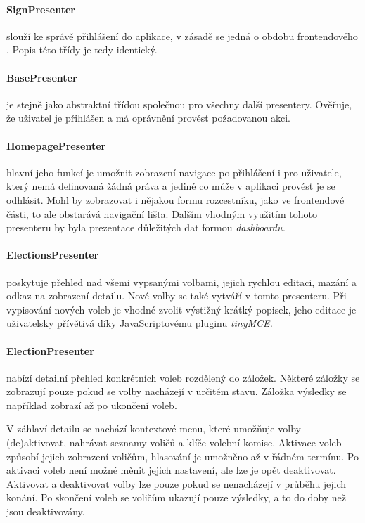 \clearpage

\paragraph{SignPresenter} slouží ke správě přihlášení do aplikace, v zásadě se jedná o obdobu frontendového . Popis této třídy je tedy identický.


\paragraph{BasePresenter} je stejně jako  abstraktní třídou společnou pro všechny další presentery. Ověřuje, že uživatel je přihlášen a má oprávnění provést požadovanou akci.


\paragraph{HomepagePresenter} hlavní jeho funkcí je umožnit zobrazení navigace po přihlášení i pro uživatele, který nemá definovaná žádná práva a jediné co může v aplikaci provést je se odhlásit. Mohl by zobrazovat i nějakou formu rozcestníku, jako ve frontendové části, to ale obstarává navigační lišta. Dalším vhodným využitím tohoto presenteru by byla prezentace důležitých dat formou \it{dashboardu}.


\paragraph{ElectionsPresenter} poskytuje přehled nad všemi vypsanými volbami, jejich rychlou editaci, mazání a odkaz na zobrazení detailu. Nové volby se také vytváří v tomto presenteru. Při vypisování nových voleb je vhodné zvolit výstižný krátký popisek, jeho editace je uživatelsky přívětivá díky JavaScriptovému pluginu \it{tinyMCE}.


\paragraph{ElectionPresenter} nabízí detailní přehled konkrétních voleb rozdělený do záložek. Některé záložky se zobrazují pouze pokud se volby nacházejí v určitém stavu. Záložka výsledky se například zobrazí až po ukončení voleb. 

V záhlaví detailu se nachází kontextové menu, které umožňuje volby (de)aktivovat, nahrávat seznamy voličů a klíče volební komise. Aktivace voleb způsobí jejich zobrazení voličům, hlasování je umožněno až v řádném termínu. Po aktivaci voleb není možné měnit jejich nastavení, ale lze je opět deaktivovat. Aktivovat a deaktivovat volby lze pouze pokud se nenacházejí v průběhu jejich konání. Po skončení voleb se voličům ukazují pouze výsledky, a to do doby než jsou deaktivovány.

